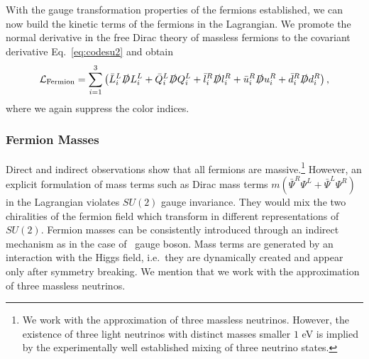 \endgroup
With the gauge transformation properties of the fermions established,
we can now build the kinetic terms of the fermions in the
Lagrangian. We promote the normal derivative in the free Dirac theory of
massless fermions to the covariant derivative
Eq.~\eqref{eq:codesu2} and obtain
\begin{align}\label{eq:fermlag}
  \mathcal{L}_{\text{Fermion}} = \sum_{i=1}^3\left( \bar{L}_i^L
    \slashed{D}L_i^L + \bar{Q}_i^L \slashed{D}Q_i^L + \bar{l}_i^R
    \slashed{D}l_i^R + \bar{u}_i^R \slashed{D}u_i^R + \bar{d}_i^R \slashed{D}d_i^R \right),
\end{align}
where we again suppress the color indices. 

\subsubsection{Fermion Masses}
\label{sec:fermmass}
Direct and indirect observations show that all fermions are
massive.\footnote{We work with
the approximation of three massless neutrinos. However, the existence of three
  light neutrinos with distinct masses smaller $1$ eV is implied by
  the experimentally well established mixing of three neutrino states.} However, an explicit
formulation of mass terms such as Dirac mass terms $m \left(\bar{\Psi}^R
  \Psi^L + \bar{\Psi}^L
  \Psi^R \right)$ in the Lagrangian violates $SU(2)$ gauge
invariance. They would mix the two chiralities of the fermion
field which transform in different representations of $SU(2)$. Fermion masses can be consistently introduced through an indirect mechanism as in the
case of \ew~gauge boson. Mass terms are generated by an
interaction with the Higgs field, i.e.~they are dynamically created
and appear only after symmetry breaking. We mention that we work with
the approximation of three massless neutrinos.


